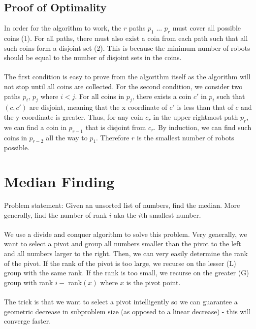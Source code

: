 \documentclass{article}
\begin{document}
\subsection*{Proof of Optimality}
In order for the algorithm to work, the $r$ paths $p_1$ ... $p_r$ must cover all possible coins (1). For all paths, there must also exist a coin from each path such that all such coins form a disjoint set (2). This is because the minimum number of robots should be equal to the number of disjoint sets in the coins.
\\
\\
The first condition is easy to prove from the algorithm itself as the algorithm will not stop until all coins are collected. For the second condition, we consider two paths $p_i$, $p_j$ where $i < j$. For all coins in $p_j$, there exists a coin $c'$ in $p_i$ such that $(c, c')$ are disjoint, meaning that the x coordinate of $c'$ is less than that of $c$ and the y coordinate is greater. Thus, for any coin $c_r$ in the upper rightmost path $p_r$, we can find a coin in $p_{r-1}$ that is disjoint from $c_r$. By induction, we can find such coins in $p_{r-2}$ all the way to $p_1$. Therefore $r$ is the smallest number of robots possible. 

\section{Median Finding}
Problem statement: Given an unsorted list of numbers, find the median. More generally, find the number of rank $i$ aka the $i$th smallest number.
\\
\\
We use a divide and conquer algorithm to solve this problem. Very generally, we want to select a pivot and group all numbers smaller than the pivot to the left and all numbers larger to the right. Then, we can very easily determine the rank of the pivot. If the rank of the pivot is too large, we recurse on the lesser (L) group with the same rank. If the rank is too small, we recurse on the greater (G) group with rank $i -$ rank$(x)$ where $x$ is the pivot point.
\\
\\
The trick is that we want to select a pivot intelligently so we can guarantee a geometric decrease in subproblem size (as opposed to a linear decrease) - this will converge faster.
\end{document}
